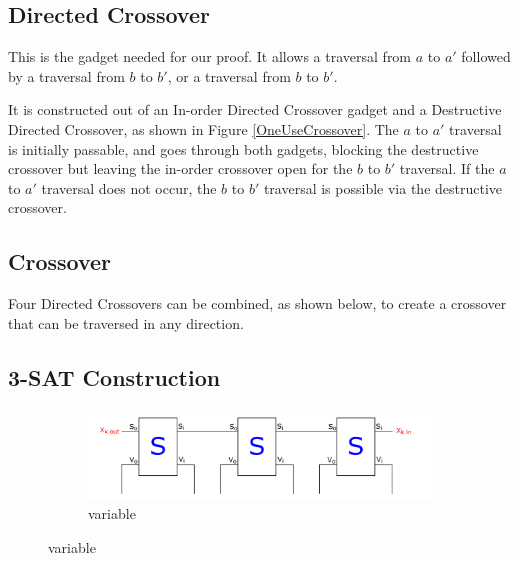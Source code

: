\documentclass[11pt]{article}
\begin{document}
\subsection{Directed Crossover}
This is the gadget needed for our proof. It allows a traversal from $a$ to $a'$ followed by a traversal from $b$ to $b'$, or a traversal from $b$ to $b'$.

It is constructed out of an In-order Directed Crossover gadget and a Destructive Directed Crossover, as shown in Figure \ref{OneUseCrossover}. The $a$ to $a'$ traversal is initially passable, and goes through both gadgets,
blocking the destructive crossover but leaving the in-order crossover open for the $b$ to $b'$ traversal. If the $a$ to $a'$ traversal does not occur, the $b$ to $b'$ traversal is possible via the destructive crossover.

\subsection{Crossover}
Four Directed Crossovers can be combined, as shown below, to create a crossover that can be traversed in any direction.

\subsection{3-SAT Construction}

\begin{figure}[!ht]
  \centering
  \begin{subfigure}[b]{0.9\textwidth}
    \includegraphics[width=\textwidth]{NPVariableGadget}
    \caption{variable}
    \label{NPVariableGadget}
  \end{subfigure}
\end{figure}
\end{document}
